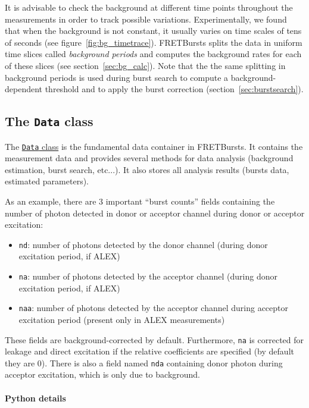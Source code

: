 It is advisable to check the background at different time points
throughout the measurements in order to track possible variations.
Experimentally, we found that when the background is not constant,
it usually varies
on time scales of tens of seconds (see figure~\ref{fig:bg_timetrace}).
FRETBursts splits the data in uniform time
slices called \textit{background periods} and computes the background rates for
each of these slices (see section~\ref{sec:bg_calc}).
Note that the the same splitting in background periods is used during
burst search to compute a background-dependent
threshold and to apply the burst correction (section~\ref{sec:burstsearch}).

\subsection{The \texttt{Data} class}
\label{sec:data_intro}

The
\href{http://fretbursts.readthedocs.org/en/latest/data_class.html}{\texttt{Data}
class} is the fundamental data container in FRETBursts. It contains the
measurement data and provides several methods for data analysis (background
estimation, burst search, etc...). It also stores all analysis results
(bursts data, estimated parameters).

As an example, there are 3 important ``burst counts'' fields containing  
the number of photon detected in donor or acceptor channel
during donor or acceptor excitation:

\begin{itemize}
\item \verb|nd|: number of photons detected by the donor channel
(during donor excitation period, if ALEX)
\item \verb|na|: number of photons detected by the acceptor channel
(during donor excitation period, if ALEX)
\item \verb|naa|: number of photons detected by the acceptor channel
during acceptor excitation period (present only in ALEX measurements)
\end{itemize}

These fields are background-corrected by default. Furthermore,
\verb|na| is corrected for leakage and direct excitation if the
relative coefficients are specified (by default they are 0).
There is also a field named \verb|nda| containing donor photon during 
acceptor excitation, which is only due to background.

\paragraph{Python details}

